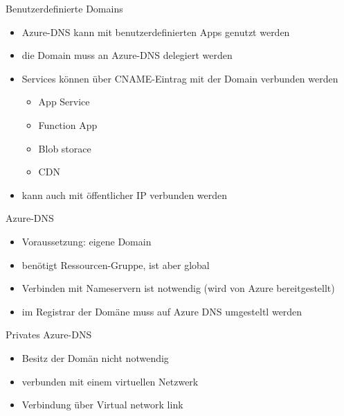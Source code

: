 \begin{flashcard}[]{Benutzerdefinierte Domains}
  \begin{itemize}
    \item Azure-DNS kann mit benutzerdefinierten Apps genutzt werden
    \item die Domain muss an Azure-DNS delegiert werden
    \item Services können über CNAME-Eintrag mit der Domain verbunden werden
      \begin{itemize}
        \item App Service
        \item Function App
        \item Blob storace
        \item CDN
      \end{itemize}
    \item kann auch mit öffentlicher IP verbunden werden
  \end{itemize}
\end{flashcard}

\begin{flashcard}[]{Azure-DNS}
  \begin{itemize}
    \item Voraussetzung: eigene Domain
    \item benötigt Ressourcen-Gruppe, ist aber global
    \item Verbinden mit Nameservern ist notwendig (wird von Azure bereitgestellt)
    \item im Registrar der Domäne muss auf Azure DNS umgesteltl werden
  \end{itemize}
\end{flashcard}

\begin{flashcard}[]{Privates Azure-DNS}
  \begin{itemize}
    \item Besitz der Domän nicht notwendig
    \item verbunden mit einem virtuellen Netzwerk
    \item Verbindung über Virtual network link
  \end{itemize}
\end{flashcard}

